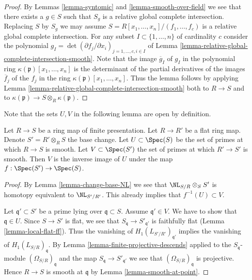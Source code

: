 \begin{proof}
By Lemmas \ref{lemma-syntomic} and \ref{lemma-smooth-over-field}
we see that there exists a $g \in S$ such that $S_g$ is a
relative global complete intersection. Replacing $S$ by $S_g$ we may assume
$S = R[x_1, \ldots, x_n]/(f_1, \ldots, f_c)$ is a relative
global complete intersection.
For any subset $I \subset \{1, \ldots, n\}$ of cardinality
$c$ consider the polynomial
$g_I = \det (\partial f_j/\partial x_i)_{j = 1, \ldots, c, i \in I}$
of Lemma \ref{lemma-relative-global-complete-intersection-smooth}.
Note that the image $\overline{g}_I$ of $g_I$ in the polynomial ring
$\kappa(\mathfrak p)[x_1, \ldots, x_n]$ is the determinant
of the partial derivatives of the images $\overline{f}_j$ of the $f_j$
in the ring $\kappa(\mathfrak p)[x_1, \ldots, x_n]$. Thus the lemma follows
by applying Lemma \ref{lemma-relative-global-complete-intersection-smooth}
both to $R \to S$ and to
$\kappa(\mathfrak p) \to S \otimes_R \kappa(\mathfrak p)$.
\end{proof}

\noindent
Note that the sets $U, V$ in the following lemma
are open by definition.

\begin{lemma}
\label{lemma-flat-base-change-locus-smooth}
Let $R \to S$ be a ring map of finite presentation.
Let $R \to R'$ be a flat ring map.
Denote $S' = R' \otimes_R S$ the base change.
Let $U \subset \Spec(S)$ be the set of primes at
which $R \to S$ is smooth.
Let $V \subset \Spec(S')$ the set of primes at
which $R' \to S'$ is smooth.
Then $V$ is the inverse image of $U$ under the
map $f : \Spec(S') \to \Spec(S)$.
\end{lemma}

\begin{proof}
By Lemma \ref{lemma-change-base-NL} we see that
$\NL_{S/R} \otimes_S S'$ is homotopy equivalent to $\NL_{S'/R'}$.
This already implies that $f^{-1}(U) \subset V$.

\medskip\noindent
Let $\mathfrak q' \subset S'$ be a prime lying over
$\mathfrak q \subset S$. Assume $\mathfrak q' \in V$.
We have to show that $\mathfrak q \in U$.
Since $S \to S'$ is flat, we see that $S_{\mathfrak q} \to S'_{\mathfrak q'}$
is faithfully flat (Lemma \ref{lemma-local-flat-ff}). Thus the vanishing of
$H_1(L_{S'/R'})_{\mathfrak q'}$ implies the
vanishing of $H_1(L_{S/R})_{\mathfrak q}$.
By Lemma \ref{lemma-finite-projective-descends}
applied to the $S_{\mathfrak q}$-module $(\Omega_{S/R})_{\mathfrak q}$
and the map $S_{\mathfrak q} \to S'_{\mathfrak q'}$ we see that
$(\Omega_{S/R})_{\mathfrak q}$ is projective. Hence
$R \to S$ is smooth at $\mathfrak q$ by
Lemma \ref{lemma-smooth-at-point}.
\end{proof}

